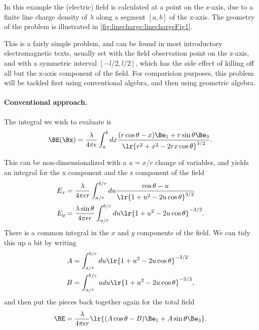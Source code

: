 %
%
In this example the (electric) field is calculated at a point on the z-axis, due to a finite line charge density of \( \lambda \) along a segment \( [a,b] \) of the x-axis.
The geometry of the problem is illustrated in \cref{fig:linecharge:linechargeFig1}.

This is a fairly simple problem, and can be found in most introductory electromagnetic texts, usually set with the field observation point on the z-axis, and with a symmetric interval \( [-l/2, l/2] \), which has the side effect of killing off all but the x-axis component of the field.  For comparision purposes, this problem will be tackled first using conventional algebra, and then using geometric algebra.

\paragraph{Conventional approach.}

The integral we wish to evaluate is
\begin{equation}\label{eqn:linecharge:160}
\BE(\Bx) = \frac{\lambda}{4 \pi \epsilon} \int_a^b dx \frac{ (r \cos\theta - x) \Be_1 + r \sin\theta \Be_3 }{ \lr{ r^2 + x^2 - 2 r x \cos\theta }^{3/2} }.
\end{equation}

This can be non-dimensionalized with a \( u = x/r \) change of variables, and yields an integral for the x component and the z component of the field
\begin{equation}\label{eqn:linecharge:180}
\begin{aligned}
E_x &= \frac{\lambda}{4 \pi \epsilon r} \int_{a/r}^{b/r} du \frac{ \cos\theta - u }{ \lr{ 1 + u^2 - 2 u \cos\theta }^{3/2} } \\
E_y &= \frac{\lambda \sin\theta}{4 \pi \epsilon r} \int_{a/r}^{b/r} du \lr{ 1 + u^2 - 2 u \cos\theta }^{-3/2}.
\end{aligned}
\end{equation}
There is a common integral in the \(x\) and \(y\) components of the field.  We can tidy this up a bit by writing
\begin{equation}\label{eqn:linecharge:200}
\begin{aligned}
A &= \int_{a/r}^{b/r} du \lr{ 1 + u^2 - 2 u \cos\theta }^{-3/2} \\
B &= \int_{a/r}^{b/r} u du \lr{ 1 + u^2 - 2 u \cos\theta }^{-3/2},
\end{aligned}
\end{equation}
and then put the pieces back together again for the total field
\begin{equation}\label{eqn:linecharge:220}
\BE = \frac{\lambda}{4 \pi \epsilon r} \lr{ (A \cos\theta - B) \Be_1 + A \sin\theta \Be_3 }.
\end{equation}

